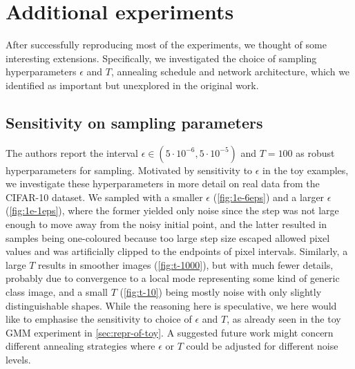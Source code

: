 \section{Additional experiments}
\label{sec:additional}
After successfully reproducing most of the experiments, we thought of some interesting extensions. Specifically, we investigated the choice of sampling hyperparameters $\epsilon$ and $T$, annealing schedule and network architecture, which we identified as important but unexplored in the original work.

\subsection{Sensitivity on sampling parameters}
The authors report the interval $\epsilon \in (5\cdot 10^{-6}, 5\cdot 10^{-5})$ and $T = 100$ as robust hyperparameters for sampling. Motivated by sensitivity to $\epsilon$ in the toy examples, we investigate these hyperparameters in more detail on real data from the CIFAR-10 dataset. We sampled with a smaller $\epsilon$ (\autoref{fig:1e-6eps}) and a larger $\epsilon$ (\autoref{fig:1e-1eps}), where the former yielded only noise since the step was not large enough to move away from the noisy initial point, and the latter resulted in samples being one-coloured because too large step size escaped allowed pixel values and was artificially clipped to the endpoints of pixel intervals. Similarly, a large $T$ results in smoother images (\autoref{fig:t-1000}), but with much fewer details, probably due to convergence to a local mode representing some kind of generic class image, and a small $T$ (\autoref{fig:t-10}) being mostly noise with only slightly distinguishable shapes. While the reasoning here is speculative, we here would like to emphasise the sensitivity to choice of $\epsilon$ and $T$, as already seen in the toy GMM experiment in \autoref{sec:repr-of-toy}. A suggested future work might concern different annealing strategies where $\epsilon$ or $T$ could be adjusted for different noise levels.

